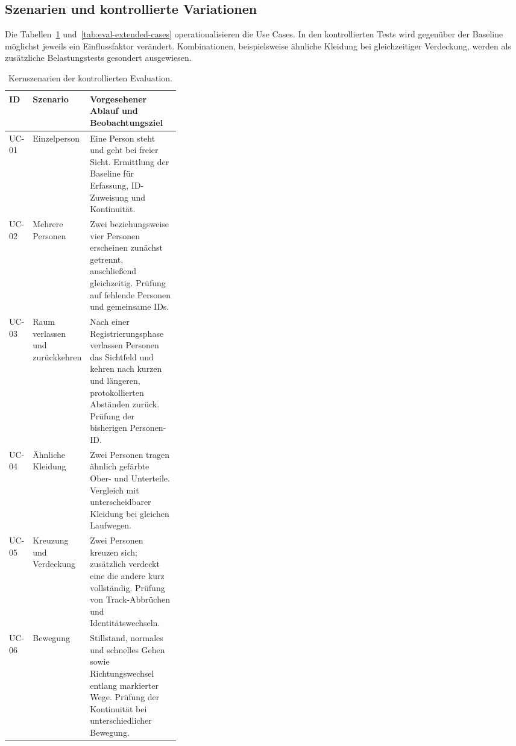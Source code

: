 \documentclass[runningheads]{llncs}
\begin{document}
\subsection{Szenarien und kontrollierte Variationen}

Die Tabellen~\ref{tab:eval-core-cases} und~\ref{tab:eval-extended-cases} operationalisieren die Use Cases. In den kontrollierten Tests wird gegenüber der Baseline möglichst jeweils ein Einflussfaktor verändert. Kombinationen, beispielsweise ähnliche Kleidung bei gleichzeitiger Verdeckung, werden als zusätzliche Belastungstests gesondert ausgewiesen.

\begin{table}[tbp]
\caption{Kernszenarien der kontrollierten Evaluation.}
\label{tab:eval-core-cases}
\centering
\small
\begin{tabularx}{\linewidth}{@{}p{0.10\linewidth}p{0.23\linewidth}X@{}}
\toprule
ID & Szenario & Vorgesehener Ablauf und Beobachtungsziel \\
\midrule
UC-01 & Einzelperson & Eine Person steht und geht bei freier Sicht. Ermittlung der Baseline für Erfassung, ID-Zuweisung und Kontinuität. \\
UC-02 & Mehrere Personen & Zwei beziehungsweise vier Personen erscheinen zunächst getrennt, anschließend gleichzeitig. Prüfung auf fehlende Personen und gemeinsame IDs. \\
UC-03 & Raum verlassen und zurückkehren & Nach einer Registrierungsphase verlassen Personen das Sichtfeld und kehren nach kurzen und längeren, protokollierten Abständen zurück. Prüfung der bisherigen Personen-ID. \\
UC-04 & Ähnliche Kleidung & Zwei Personen tragen ähnlich gefärbte Ober- und Unterteile. Vergleich mit unterscheidbarer Kleidung bei gleichen Laufwegen. \\
UC-05 & Kreuzung und Verdeckung & Zwei Personen kreuzen sich; zusätzlich verdeckt eine die andere kurz vollständig. Prüfung von Track-Abbrüchen und Identitätswechseln. \\
UC-06 & Bewegung & Stillstand, normales und schnelles Gehen sowie Richtungswechsel entlang markierter Wege. Prüfung der Kontinuität bei unterschiedlicher Bewegung. \\
\bottomrule
\end{tabularx}
\end{table}
\end{document}
